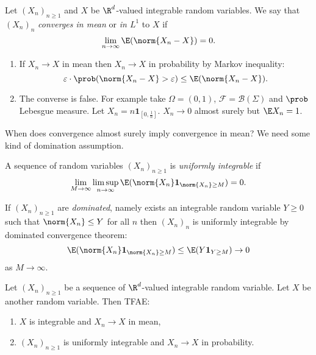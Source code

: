 \documentclass[a4paper]{article}
\renewcommand{\P}{\prob} %
\begin{document}
\begin{definition}
  Let \((X_n)_{n \geq 1}\) and \(X\) be \(\R^d\)-valued integrable random variables. We say that \((X_n)_n\) \emph{converges in mean} or \emph{in \(L^1\)} to \(X\) if
  \[
    \lim_{n \to \infty} \E(\norm{X_n - X}) = 0.
  \]
\end{definition}

\begin{remark}\leavevmode
  \begin{enumerate}
  \item If \(X_n \to X\) in mean then \(X_n \to X\) in probability by Markov inequality:
    \[
      \varepsilon \cdot \P(\norm{X_n - X} > \varepsilon) \leq \E(\norm{X_n - X}).
    \]
  \item The converse is false. For example take \(\Omega = (0, 1)\), \(\mathcal F = \mathcal B(\Sigma)\) and \(\P\) Lebesgue measure. Let \(X_n = n \mathbf 1_{[0, \frac{1}{n}]}\). \(X_n \to 0\) almost surely but \(\E X_n = 1\).
  \end{enumerate}
\end{remark}

When does convergence almost surely imply convergence in mean? We need some kind of domination assumption.

\begin{definition}
  A sequence of random variables \((X_n)_{n \geq 1}\) is \emph{uniformly integrable} if
  \[
    \lim_{M \to \infty} \limsup_{n \to \infty} \E(\norm{X_n} \mathbf 1_{\norm{X_n} \geq M}) = 0.
  \]
\end{definition}

\begin{remark}
  If \((X_n)_{n \geq 1}\) are \emph{dominated}, namely exists an integrable random variable \(Y \geq 0\) such that \(\norm{X_n} \leq Y\) for all \(n\) then \((X_n)_n\) is uniformly integrable by dominated convergence theorem:
  \[
    \E(\norm{X_n} \mathbf 1_{\norm{X_n} \geq M}) \leq \E(Y \mathbf 1_{Y \geq M}) \to 0
  \]
  as \(M \to \infty\).
\end{remark}

\begin{theorem}
  Let \((X_n)_{n \geq 1}\) be a sequence of \(\R^d\)-valued integrable random variable. Let \(X\) be another random variable. Then TFAE:
  \begin{enumerate}
  \item \(X\) is integrable and \(X_n \to X\) in mean,
  \item \((X_n)_{n \geq 1}\) is uniformly integrable and \(X_n \to X\) in probability.
  \end{enumerate}
\end{theorem}
\end{document}
